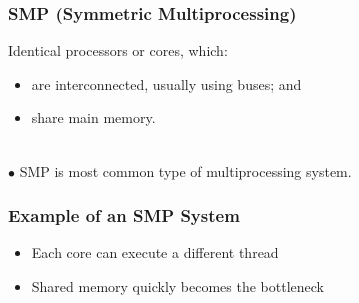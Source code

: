 \documentclass[aspectratio=43]{beamer}
\newenvironment{changemargin}[1]{%
  \begin{list}{}{%
    \setlength{\topsep}{0pt}%
    \setlength{\leftmargin}{#1}%
    \setlength{\rightmargin}{1em}
    \setlength{\listparindent}{\parindent}%
    \setlength{\itemindent}{\parindent}%
    \setlength{\parsep}{\parskip}%
  }%
  \item[]}{\end{list}}
\begin{document}
\begin{frame}
  \frametitle{SMP (Symmetric Multiprocessing)}

  \begin{changemargin}{2cm}
    Identical processors or cores, which:
    \begin{itemize}
    \item are interconnected, usually using buses; and
    \item share main memory.
    \end{itemize}
    ~\\[1em]
    $\bullet$ SMP is most common type of multiprocessing system.
  \end{changemargin}
\end{frame}

\begin{frame}
  \frametitle{Example of an SMP System}
\begin{center}
\end{center}

  \begin{itemize}
    \item Each core can execute a different thread
    \item Shared memory quickly becomes the bottleneck
  \end{itemize}
\end{frame}
\end{document}
